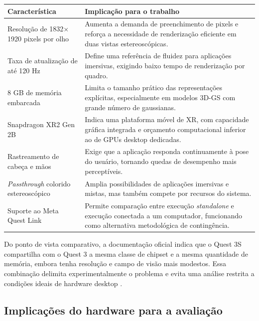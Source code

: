 \begin{quadro}[H]
\centering
\footnotesize
\caption{Características técnicas relevantes do Meta Quest 3S para o pipeline proposto.}
\label{qua:meta_quest_3s_specs}
\renewcommand{\arraystretch}{1.2}
\setlength{\tabcolsep}{4pt}
\begin{tabularx}{\textwidth}{|p{4.2cm}|X|}
\hline
\textbf{Característica} & \textbf{Implicação para o trabalho} \\
\hline
Resolução de 1832$\times$1920 pixels por olho & Aumenta a demanda de preenchimento de pixels e reforça a necessidade de renderização eficiente em duas vistas estereoscópicas. \\
\hline
Taxa de atualização de até 120 Hz & Define uma referência de fluidez para aplicações imersivas, exigindo baixo tempo de renderização por quadro. \\
\hline
8 GB de memória embarcada & Limita o tamanho prático das representações explícitas, especialmente em modelos 3D-GS com grande número de gaussianas. \\
\hline
Snapdragon XR2 Gen 2B & Indica uma plataforma móvel de XR, com capacidade gráfica integrada e orçamento computacional inferior ao de GPUs desktop dedicadas. \\
\hline
Rastreamento de cabeça e mãos & Exige que a aplicação responda continuamente à pose do usuário, tornando quedas de desempenho mais perceptíveis. \\
\hline
\textit{Passthrough} colorido estereoscópico & Amplia possibilidades de aplicações imersivas e mistas, mas também compete por recursos do sistema. \\
\hline
Suporte ao Meta Quest Link & Permite comparação entre execução \textit{standalone} e execução conectada a um computador, funcionando como alternativa metodológica de contingência. \\
\hline
\end{tabularx}
\end{quadro}

Do ponto de vista comparativo, a documentação oficial indica que o Quest 3S compartilha com o Quest 3 a mesma classe de chipset e a mesma quantidade de memória, embora tenha resolução e campo de visão mais modestos. Essa combinação delimita experimentalmente o problema e evita uma análise restrita a condições ideais de hardware desktop \cite{metaquest3s2024,qualcommxr2gen2}.

\subsection{Implicações do hardware para a avaliação}

